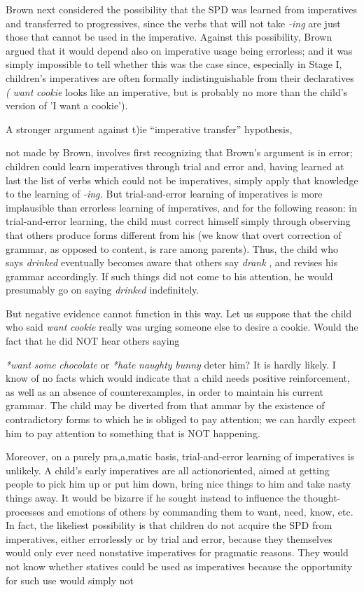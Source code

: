 Brown next considered the possibility that the SPD was learned from imperatives and transferred to progressives, since the verbs that will not take \textit{{}-ing} are just those that cannot be used in the imperative. Against this possibility, Brown argued that it would depend also on imperative usage being errorless; and it was simply impossible to tell whether this was the case since, especially in Stage I, children's impera\-tives are often formally indistinguishable from their declaratives \textit{(} \textit{want} \textit{cookie} looks like an imperative, but is probably no more than the child's version of 'I want a cookie').

A stronger argument against t)ie ``imperative transfer'' hypothesis,


not made by Brown, involves first recognizing that Brown's argument is in error; children could learn imperatives through trial and error and, having learned at last the list of verbs which could not be imperatives, simply apply that knowledge to the learning of \textit{{}-ing.} But trial-and-error learning of imperatives is more implausible than errorless learning of imperatives, and for the following reason: in trial-and-error learning, the child must correct himself simply through observing that others produce forms different from his (we know that overt correction of grammar, as opposed to content, is rare among parents). Thus, the child who says \textit{drinked} eventually becomes aware that others say \textit{drank} , and revises his grammar accordingly. If such things did not come to his attention, he would presumably go on saying \textit{d}\textit{rinked} indefinitely.

But negative evidence cannot function in this way. Let us sup\-pose that the child who said \textit{want} \textit{cookie} really was urging someone else to desire a cookie. Would the fact that he did NOT hear others saying

\textit{*want} \textit{some} \textit{chocolate} or \textit{*hate} \textit{naughty} \textit{bunny} deter him? It is hardly likely. I know of no facts which would indicate that a child needs positive reinforcement, as well as an absence of counterexamples, in order to maintain his current grammar. The child may be diverted from that ammar by the existence of contradictory forms to which he is obliged to pay attention; we can hardly expect him to pay atten\-tion to something that is NOT happening.

Moreover, on a purely pra,a,matic basis, trial-and-error learning of imperatives is unlikely. A child's early imperatives are all action\-oriented, aimed at getting people to pick him up or put him down, bring nice things to him and take nasty things away. It would be bizarre if he sought instead to influence the thought-processes and emotions of others by commanding them to want, need, know, etc. In fact, the likeliest possibility is that children do not acquire the SPD from imperatives, either errorlessly or by trial and error, because they them\-selves would only ever need nonstative imperatives for pragmatic reasons. They would not know whether statives could be used as imperatives because the opportunity for such use would simply not

